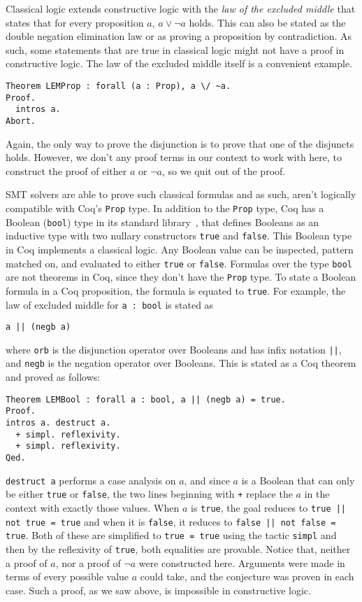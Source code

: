 \documentclass{article}
\begin{document}
	Classical logic extends 
	constructive logic with the 
	\textit{law of the excluded 
	middle} that states that for 
	every proposition $a$, 
	$a \lor \neg a$ holds. This can 
	also be stated as the 
	double negation elimination 
	law or as proving a 
	proposition by contradiction. As
	such, some statements that are true 
	in classical logic might not have 
	a proof in constructive logic.
	The law of the excluded middle
	itself is a convenient example.
\begin{verbatim}
Theorem LEMProp : forall (a : Prop), a \/ ~a.
Proof.
  intros a. 
Abort.
\end{verbatim}
	Again, the only way to prove the 
	disjunction is to prove that one 
	of the disjuncts holds. However, 
	we don't any proof terms in our
	context to work 
	with here, to construct the 
	proof of either $a$ or $\neg a$,
	so we quit out of the proof.
	
	SMT solvers are able to prove 
	such classical formulas and as
	such, aren't logically compatible
	with Coq's \texttt{Prop} type. 
	In addition to the \texttt{Prop} 
	type, Coq has a Boolean 
	(\texttt{bool}) type in its standard 
	library~\cite{CoqBool}, that defines 
	Booleans as an 
	inductive type with two nullary
	constructors \texttt{true} and
	\texttt{false}. This Boolean type 
	in Coq implements a classical 
	logic. Any Boolean value can 
	be inspected, pattern matched on,
	and evaluated to either 
	\texttt{true} or \texttt{false}.
	Formulas over the type 
	\texttt{bool} are not theorems
	in Coq, since they don't have 
	the \texttt{Prop} type. To 
	state a Boolean formula in a 
	Coq proposition, the formula is 
	equated to \texttt{true}. 
	For example, the law of 
	excluded middle for 
	\texttt{a : bool} is stated as 
	\begin{center}
	\texttt{a || (negb a)}
	\end{center}
	where \texttt{orb} is the 
	disjunction operator over 
	Booleans and has 
	infix notation \texttt{||},
	and \texttt{negb} is the 
	negation operator over 
	Booleans.
	This is stated as a Coq theorem 
	and proved as follows:
\begin{verbatim}
Theorem LEMBool : forall a : bool, a || (negb a) = true.
Proof.
intros a. destruct a.
  + simpl. reflexivity.
  + simpl. reflexivity.
Qed.
\end{verbatim}
	\texttt{destruct a} performs a 
	case analysis on $a$, and since $a$ 
	is a Boolean that can 
	only be either \texttt{true}
	or \texttt{false}, the two lines
	beginning with \texttt{+} 
	replace the $a$ in the context
	with exactly those values.
	When $a$ is \texttt{true}, the 
	goal reduces to 
	\texttt{true || not true = true}
	and when it is \texttt{false}, it
	reduces to 
	\texttt{false || not false = true}.
	Both of these are simplified to 
	\texttt{true = true} using the 
	tactic \texttt{simpl} and then 
	by the reflexivity of 
	\texttt{true}, both equalities
	are provable. Notice that, 
	neither a proof of $a$, nor 
	a proof of $\neg a$ were 
	constructed here. Arguments were
	made in terms of every possible 
	value $a$ could take, and the
	conjecture was proven in 
	each case. Such a proof, as we 
	saw above, is impossible in 
	constructive logic.
	
\end{document}
